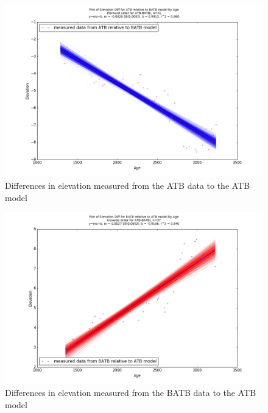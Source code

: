 \newpage

\begin{figure}[h]
	\includegraphics[width=0.9\linewidth]{data/bothNonZero/withinSeventyFivePercent/gias/theGIA_ATB_relative_to_BATB.png}
	\caption{Differences in elevation measured from the ATB data to the ATB model}
	\label{fig:gias_ATBxBATB}
\end{figure}
\newpage


\begin{figure}[h]
	\includegraphics[width=0.9\linewidth]{data/bothNonZero/withinSeventyFivePercent/gias/theGIA_BATB_relative_to_ATB.png}
	\caption{Differences in elevation measured from the BATB data to the ATB model}
	\label{fig:gias_BATBxATB}
\end{figure}
\newpage



